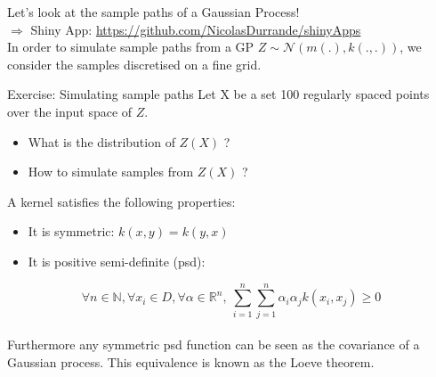 \begin{frame}{}
Let's look at the sample paths of a Gaussian Process!\\
\vspace{2mm}
\alert{$\Rightarrow$ Shiny App:} \url{https://github.com/NicolasDurrande/shinyApps} \\
\vspace{5mm}
In order to simulate sample paths from a GP $Z \sim \mathcal{N}(m(.),k(.,.))$, we consider the samples discretised on a fine grid.
\vspace{5mm}
\begin{exampleblock}{Exercise: Simulating sample paths}
Let X be a set 100 regularly spaced points over the input space of $Z$.
\begin{itemize}
	\item What is the distribution of $Z(X)$ ?
	\item How to simulate samples from $Z(X)$ ?
\end{itemize}
\end{exampleblock}
\end{frame}

\begin{frame}{}
A kernel satisfies the following properties:
\begin{itemize}
	\item It is symmetric: $k(x,y) = k(y,x)$
	\item It is positive semi-definite (psd):
\end{itemize}
\begin{equation*}
	\forall n \in \mathds{N}, \forall x_i \in D, \forall \alpha \in \mathds{R}^n,\  \sum_{i=1}^n \sum_{j=1}^n \alpha_i \alpha_j k(x_i,x_j) \geq 0
\end{equation*}
\vspace{5mm} \\
Furthermore any symmetric psd function can be seen as the covariance of a Gaussian process. This equivalence is known as the Loeve theorem.
\end{frame}

